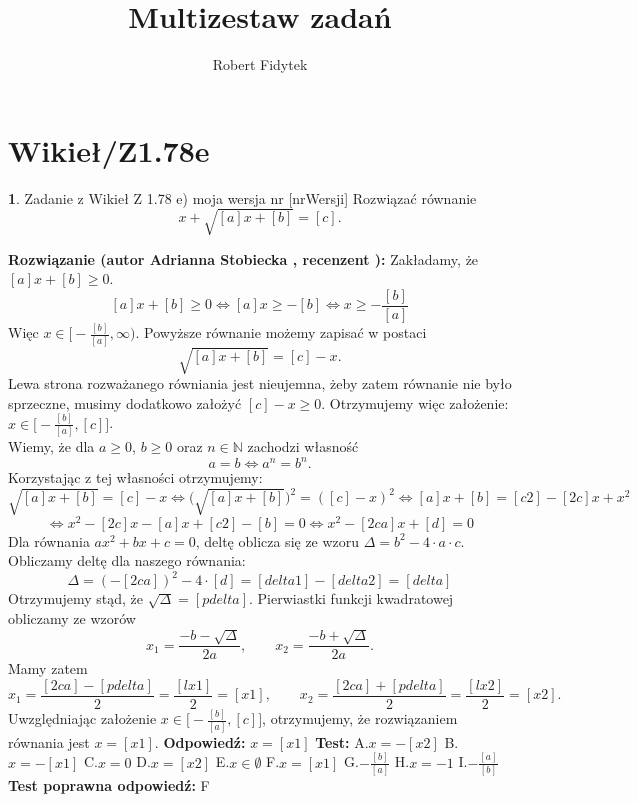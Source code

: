 \documentclass[12pt, a4paper]{article}
\title{Multizestaw zadań}
\author{Robert Fidytek}
\date{}
\theoremstyle{definition} %
\newtheorem{zad}{}
\newcommand{\kategoria}[1]{\section{#1}} %
\newcommand{\zadStart}[1]{\begin{zad}#1\newline} %
\newcommand{\zadStop}{\end{zad}}   %
\newcommand{\rozwStart}[2]{\noindent \textbf{Rozwiązanie (autor #1 , recenzent #2): }\newline} %
\newcommand{\rozwStop}{\newline}                                            %
\newcommand{\odpStart}{\noindent \textbf{Odpowiedź:}\newline}    %
\newcommand{\odpStop}{\newline}                                             %
\newcommand{\testStart}{\noindent \textbf{Test:}\newline} %
\newcommand{\testStop}{\newline} %
\newcommand{\kluczStart}{\noindent \textbf{Test poprawna odpowiedź:}\newline} %
\newcommand{\kluczStop}{\newline} %
\begin{document}
\maketitle


\kategoria{Wikieł/Z1.78e}
\zadStart{Zadanie z Wikieł Z 1.78 e) moja wersja nr [nrWersji]}
Rozwiązać równanie
$$x+\sqrt{[a]x+[b]}=[c].$$
\zadStop
\rozwStart{Adrianna Stobiecka}{}
Zakładamy, że $[a]x+[b]\geq0$.
$$[a]x+[b]\geq0\Leftrightarrow [a]x\geq-[b]\Leftrightarrow x\geq-\frac{[b]}{[a]}$$
Więc $x\in\big[-\frac{[b]}{[a]},\infty\big)$. Powyższe równanie możemy zapisać w postaci
$$\sqrt{[a]x+[b]}=[c]-x.$$
Lewa strona rozważanego równiania jest nieujemna, żeby zatem równanie nie było sprzeczne, musimy dodatkowo założyć $[c]-x\geq0$. Otrzymujemy więc założenie: $x\in\big[-\frac{[b]}{[a]},[c]\big]$.
\\Wiemy, że dla $a\geq0$, $b\geq0$ oraz $n\in\mathbb{N}$ zachodzi własność
$$a=b\Leftrightarrow a^n=b^n.$$ 
Korzystając z tej własności otrzymujemy:
$$\sqrt{[a]x+[b]}=[c]-x\Leftrightarrow\big(\sqrt{[a]x+[b]}\big)^2=([c]-x)^2\Leftrightarrow [a]x+[b]=[c2]-[2c]x+x^2$$
$$\Leftrightarrow x^2-[2c]x-[a]x+[c2]-[b]=0\Leftrightarrow x^2-[2ca]x+[d]=0$$
Dla równania $ax^2+bx+c=0$, deltę oblicza się ze wzoru $\Delta=b^2-4\cdot a\cdot c$. Obliczamy deltę dla naszego równania:
$$\Delta=(-[2ca])^2-4\cdot[d]=[delta1]-[delta2]=[delta]$$
Otrzymujemy stąd, że $\sqrt{\Delta}=[pdelta]$. Pierwiastki funkcji kwadratowej obliczamy ze wzorów
$$x_1=\frac{-b-\sqrt{\Delta}}{2a},\qquad x_2=\frac{-b+\sqrt{\Delta}}{2a}.$$ 
Mamy zatem
$$x_1=\frac{[2ca]-[pdelta]}{2}=\frac{[lx1]}{2}=[x1],\qquad x_2=\frac{[2ca]+[pdelta]}{2}=\frac{[lx2]}{2}=[x2].$$
Uwzględniając założenie $x\in\big[-\frac{[b]}{[a]},[c]\big]$, otrzymujemy, że rozwiązaniem równania jest $x=[x1].$
\rozwStop
\odpStart
$x=[x1]$
\odpStop
\testStart
A.$x=-[x2]$
B.$x=-[x1]$
C.$x=0$
D.$x=[x2]$
E.$x\in\emptyset$
F.$x=[x1]$
G.$-\frac{[b]}{[a]}$
H.$x=-1$
I.$-\frac{[a]}{[b]}$
\testStop
\kluczStart
F
\kluczStop
\end{document}
